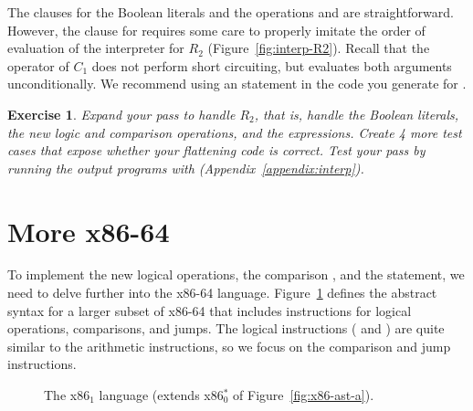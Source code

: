 \documentclass[11pt]{book}
\newtheorem{exercise}[theorem]{Exercise}
\begin{document}
The  clauses for the Boolean literals and the operations
 and  are straightforward.  However, the
 clause for  requires some care to properly
imitate the order of evaluation of the interpreter for $R_2$
(Figure~\ref{fig:interp-R2}). Recall that the  operator of
$C_1$ does not perform short circuiting, but evaluates both arguments
unconditionally. We recommend using an  statement in the code
you generate for .

\begin{exercise}\normalfont
Expand your  pass to handle $R_2$, that is, handle the
Boolean literals, the new logic and comparison operations, and the
 expressions. Create 4 more test cases that expose whether
your flattening code is correct. Test your  pass by
running the output programs with 
(Appendix~\ref{appendix:interp}).
\end{exercise}


\section{More x86-64}
\label{sec:x86-1}

To implement the new logical operations, the comparison , and
the  statement, we need to delve further into the x86-64
language. Figure~\ref{fig:x86-ast-b} defines the abstract syntax for a
larger subset of x86-64 that includes instructions for logical
operations, comparisons, and jumps.  The logical instructions
( and ) are quite similar to the arithmetic
instructions, so we focus on the comparison and jump instructions.

\begin{figure}[tbp]
\caption{The x86$_1$ language (extends x86$^{*}_0$ of Figure~\ref{fig:x86-ast-a}).}
\label{fig:x86-ast-b}
\end{figure}
\end{document}
